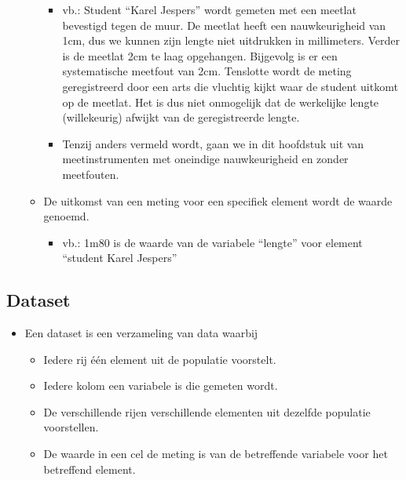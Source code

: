 \documentclass[]{tufte-book}
\providecommand{\tightlist}{%
  \setlength{\itemsep}{0pt}\setlength{\parskip}{0pt}}
\begin{document}
\begin{itemize}
\begin{itemize}
    \begin{itemize}
    \tightlist
    \item
      vb.: Student ``Karel Jespers'' wordt gemeten met een meetlat bevestigd tegen de muur. De meetlat heeft een nauwkeurigheid van 1cm, dus we kunnen zijn lengte niet uitdrukken in millimeters. Verder is de meetlat 2cm te laag opgehangen. Bijgevolg is er een systematische meetfout van 2cm. Tenslotte wordt de meting geregistreerd door een arts die vluchtig kijkt waar de student uitkomt op de meetlat. Het is dus niet onmogelijk dat de werkelijke lengte (willekeurig) afwijkt van de geregistreerde lengte.
    \item
      Tenzij anders vermeld wordt, gaan we in dit hoofdstuk uit van meetinstrumenten met oneindige nauwkeurigheid en zonder meetfouten.
    \end{itemize}
  \item
    De uitkomst van een meting voor een specifiek element wordt de waarde genoemd.

    \begin{itemize}
    \tightlist
    \item
      vb.: 1m80 is de waarde van de variabele ``lengte'' voor element ``student Karel Jespers''
    \end{itemize}
  \end{itemize}
\end{itemize}

\hypertarget{dataset}{%
\subsection{Dataset}\label{dataset}}

\begin{itemize}
\tightlist
\item
  Een dataset is een verzameling van data waarbij

  \begin{itemize}
  \tightlist
  \item
    Iedere rij één element uit de populatie voorstelt.
  \item
    Iedere kolom een variabele is die gemeten wordt.
  \item
    De verschillende rijen verschillende elementen uit dezelfde populatie voorstellen.
  \item
    De waarde in een cel de meting is van de betreffende variabele voor het betreffend element.
  \end{itemize}
\end{itemize}
\end{document}
